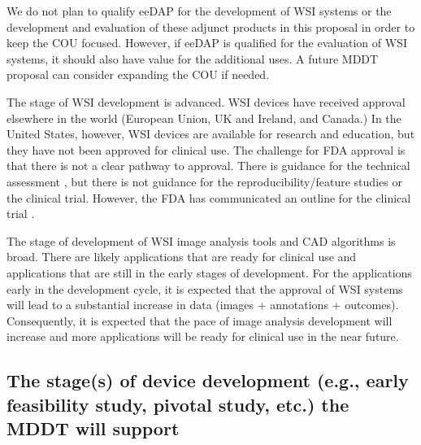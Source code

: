 \documentclass{article}%
\begin{document}
We do not plan to qualify eeDAP for the development of WSI systems or the
development and evaluation of these adjunct products in this proposal in order
to keep the COU focused. However, if eeDAP is qualified for the evaluation of
WSI systems, it should also have value for the additional uses. A future MDDT
proposal can consider expanding the COU if needed.

The stage of WSI development is advanced. WSI devices have received approval
elsewhere in the world (European Union, UK and Ireland, and Canada.) In the
United States, however, WSI devices are available for research and education,
but they have not been approved for clinical use. The challenge for FDA
approval is that there is not a clear pathway to approval. There is guidance
for the technical assessment \cite{FDA2016_Guidance-DigiPathTechnical}, but
there is not guidance for the reproducibility/feature studies or the clinical
trial. However, the FDA has communicated an outline for the clinical trial
\cite{Anderson2016_Path-Visions_presentation}.

The stage of development of WSI image analysis tools and CAD algorithms is
broad. There are likely applications that are ready for clinical use and
applications that are still in the early stages of development. For the
applications early in the development cycle, it is expected that the approval
of WSI systems will lead to a substantial increase in data (images +
annotations + outcomes). Consequently, it is expected that the pace of image
analysis development will increase and more applications will be ready for
clinical use in the near future.

\subsection{The stage(s) of device development (e.g., early feasibility study,
pivotal study, etc.) the MDDT will support}

\label{the-stages-of-device-development-e.g.-early-feasibility-study-pivotal-study-etc.}%
\end{document}
